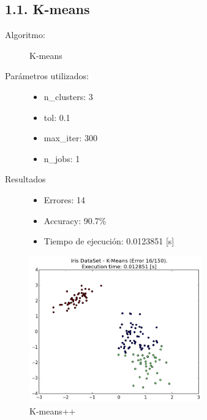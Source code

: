 \documentclass{article}
\begin{document}
\subsection*{1.1. \; K-means}

\begin{description}
  \item[Algoritmo:] K-means
  \item[Parámetros utilizados:] \hfill
    \begin{itemize}
      \item n\_clusters: 3
      \item tol: 0.1
      \item max\_iter: 300
      \item n\_jobs: 1
    \end{itemize}
  \item[Resultados]\hfill
    \begin{itemize}
      \item Errores: 14
      \item Accuracy:  90.7\%
      \item Tiempo de ejecución: 0.0123851 [s]
    \end{itemize}
\end{description}

\begin{figure}[H]
  \centering
  \includegraphics[width=0.666\textwidth]{img/K-Means.png}
  \caption{K-means++}
\end{figure}
\newpage
\end{document}

